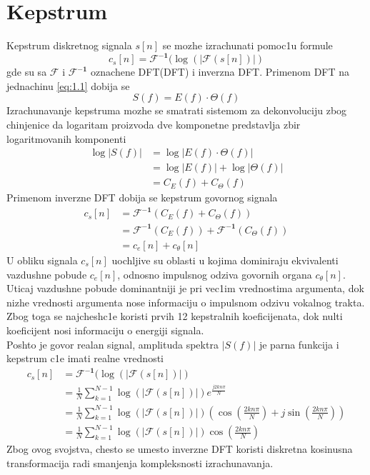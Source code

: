 \documentclass[a4paper, openany, oneside, 11pt]{book}
\begin{document}
\section{Kepstrum}
Kepstrum \cite{kepstrum} diskretnog signala $s[n]$ se mozhe izrachunati pomoc1u formule 
\begin{equation}
c_s[n] = \boldsymbol{\mathcal{F}^{-1}}(\log(|\boldsymbol{\mathcal{F}}(s[n])|)
\end{equation}
gde su sa $\boldsymbol{\mathcal{F}}$ i $\boldsymbol{\mathcal{F}^{-1}}$ oznachene \acrlong{DFT}(\acrshort{DFT}) i inverzna \acrshort{DFT}. Primenom \acrshort{DFT} na jednachinu \ref{eq:1.1} dobija se
\begin{equation}
S(f) = E(f)\cdot\Theta(f)
\end{equation}
Izrachunavanje kepstruma mozhe se smatrati sistemom za dekonvoluciju zbog chinjenice da logaritam proizvoda dve komponetne predstavlja zbir logaritmovanih komponenti
\begin{align}
\log|S(f)| &= \log|E(f)\cdot\Theta(f)|\\
           &= \log|E(f)| + \log|\Theta(f)|\\
           &= C_E(f)+ C_{\Theta}(f)
\end{align}
Primenom inverzne \acrshort{DFT} dobija se kepstrum govornog signala
\begin{align}
c_s[n] &= \boldsymbol{\mathcal{F}^{-1}}(C_E(f)+ C_{\Theta}(f))\\
       &= \boldsymbol{\mathcal{F}^{-1}}(C_E(f))+
       	  \boldsymbol{\mathcal{F}^{-1}}(C_{\Theta}(f))\\
       &= c_e[n]+ c_{\theta}[n]
\end{align}
U obliku signala $c_s[n]$ uochljive su oblasti u kojima dominiraju ekvivalenti vazdushne pobude  $c_e[n]$, odnosno impulsnog odziva govornih organa $c_{\theta}[n]$. Uticaj vazdushne pobude dominantniji je pri vec1im vrednostima argumenta, dok nizhe vrednosti argumenta nose informaciju o impulsnom odzivu vokalnog trakta. Zbog toga se najchesh\-c1e koristi prvih 12 kepstralnih koeficijenata, dok nulti koeficijent nosi informaciju o energiji signala.\\
Poshto je govor realan signal, amplituda spektra $|S(f)|$ je parna funkcija i kepstrum c1e imati realne vrednosti
\begin{align}
c_s[n] &= \boldsymbol{\mathcal{F}^{-1}}(\log(|\boldsymbol{\mathcal{F}}(s[n])|)\\
&=\frac{1}{N}\sum^{N-1}_{k=1}\log(|\boldsymbol{\mathcal{F}}(s[n])|)e^{\frac{j2kn\pi}{N}}\\
&=\frac{1}{N}\sum^{N-1}_{k=1}\log(|\boldsymbol{\mathcal{F}}(s[n])|)(\cos\left(\frac{2kn\pi}{N}\right)+j\sin\left(\frac{2kn\pi}{N}\right))\\
&=\frac{1}{N}\sum^{N-1}_{k=1}\log(|\boldsymbol{\mathcal{F}}(s[n])|)\cos\left(\frac{2kn\pi}{N}\right)
\end{align}
Zbog ovog svojstva, chesto se umesto inverzne \acrshort{DFT} koristi diskretna kosinusna transformacija radi smanjenja kompleksnosti izrachunavanja.
\end{document}
